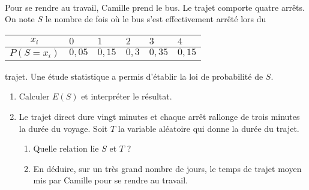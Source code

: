 \documentclass[11pt]{article}
\begin{document}
\begin{exo}~\\
  \begin{minipage}[]{.5\textwidth}
    Pour se rendre au travail, Camille prend le bus. Le trajet comporte quatre
    arrêts. On note $S$ le nombre de fois où le bus s'est effectivement arrêté
    lors du 
  \end{minipage}
  \begin{minipage}[]{.5\textwidth}
\begin{center}
  \renewcommand{\arraystretch}{1.3}
  \begin{tabularx}{1\textwidth}{|c|Y|Y|Y|Y|Y|}
    \hline
    $x_i$ & $0$ & $1$ & $2$ & $3$ & $4$ \\
    \hline
    $P\left( S=x_i \right)$ & $0,05$ & $0,15$ & $0,3$ & $0,35$ & $0,15$ \\
    \hline
  \end{tabularx}
\end{center}
  \end{minipage}
  trajet. Une étude statistique a permis d'établir la loi de probabilité de $S$.
  \begin{enumerate}
    \item Calculer $E(S)$ et interpréter le résultat.
    \item Le trajet direct dure vingt minutes et chaque arrêt rallonge de trois
      minutes la durée du voyage. Soit $T$ la variable aléatoire qui donne la
      durée du trajet.
      \begin{enumerate}
        \item Quelle relation lie $S$ et $T$ ?
        \item En déduire, sur un très grand nombre de jours, le temps de trajet
          moyen mis par Camille pour se rendre au travail.
      \end{enumerate}
  \end{enumerate}
\end{exo}
\end{document}
